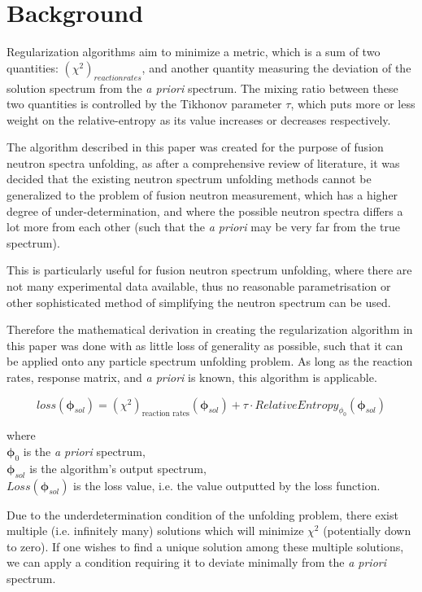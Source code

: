 \documentclass[a4paper, 12pt]{article}
\newcommand{\ve}[1]{\boldsymbol{#1}}
\newcommand{\apriori}[0]{\textit{a priori} }
\begin{document}
\section{Background}
Regularization algorithms aim to minimize a metric, which is a sum of two quantities: $(\chi^2)_{reaction rates}$, and another quantity measuring the deviation of the solution spectrum from the \apriori spectrum. The mixing ratio between these two quantities is controlled by the Tikhonov parameter $\tau$, which puts more or less weight on the relative-entropy as its value increases or decreases respectively.

The algorithm described in this paper was created for the purpose of fusion neutron spectra unfolding, as after a comprehensive review of literature, it was decided that the existing neutron spectrum unfolding methods cannot be generalized to the problem of fusion neutron measurement, which has a higher degree of under-determination, and where the possible neutron spectra differs a lot more from each other (such that the \apriori may be very far from the true spectrum).

This is particularly useful for fusion neutron spectrum unfolding, where there are not many experimental data available, thus no reasonable parametrisation or other sophisticated method of simplifying the neutron spectrum can be used.

Therefore the mathematical derivation in creating the regularization algorithm in this paper was done with as little loss of generality as possible, such that it can be applied onto any particle spectrum unfolding problem. As long as the reaction rates, response matrix, and \apriori is known, this algorithm is applicable.

\begin{equation} \label{regularization text equation}
loss(\ve{\phi}_{sol}) = (\chi^2)_{\text{reaction rates}}(\ve{\phi}_{sol}) + \tau \cdot RelativeEntropy_{\phi_0} (\ve{\phi}_{sol})
\end{equation}

where\\
$\ve{\phi}_0$ is the \apriori spectrum,\\
$\ve{\phi}_{sol}$ is the algorithm's output spectrum,\\
$Loss(\ve{\phi}_{sol})$ is the loss value, i.e. the value outputted by the loss function.

Due to the underdetermination condition of the unfolding problem, there exist multiple (i.e. infinitely many) solutions which will minimize $\chi^2$ (potentially down to zero). If one wishes to find a unique solution among these multiple solutions, we can apply a condition requiring it to deviate minimally from the \apriori spectrum.
\end{document}
